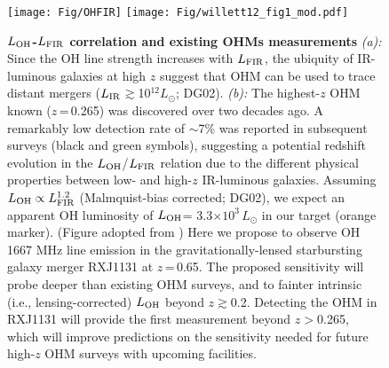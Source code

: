 \documentclass[letterpaper,11pt]{article}
\newcommand{\Lsun}{\mbox{$L_{\odot}$}\xspace}
\newcommand{\LFIR}{\mbox{$L_{\rm FIR}$}\xspace}
\newcommand{\LOH}{$L_{\rm OH}$\xspace}
\newcommand{\E}[1]{\mbox{$\times10^{#1}$}}
\newcommand{\eq}{\,=\,}
\begin{document}
\begin{figure}[ptbh]
\texttt{[image: Fig/OHFIR]} \hspace{-1.25em}
\texttt{[image: Fig/willett12\_fig1\_mod.pdf]}
\caption{{\bf \LOH-\LFIR correlation and existing OHMs measurements}
{\it (a):} Since the OH line strength increases with \LFIR,
the ubiquity of IR-luminous galaxies at high $z$ suggest that OHM can be used to trace distant mergers 
($L_{\rm IR}$$\gtrsim$10$^{12}$\Lsun; DG02).
{\it (b):} The highest-$z$ OHM known ($z$\eq0.265) was discovered over two decades ago. 
A remarkably low detection rate of $\sim$7\% was reported in subsequent surveys (black and green symbols), 
suggesting a potential redshift evolution in the \LOH/\LFIR relation
due to the different physical properties between low- and high-$z$ IR-luminous galaxies.
Assuming $L_{\rm OH}\propto L_{\rm FIR}^{1.2}$ (Malmquist-bias corrected; DG02), 
we expect an apparent OH luminosity of \LOH= 3.3\E{3}\,\Lsun in our target (orange marker). (Figure adopted from 
\citealt{Willett12a})
Here we propose to observe OH 1667 MHz line emission in the gravitationally-lensed starbursting 
galaxy merger RXJ1131 at $z$\eq0.65.
The proposed sensitivity will
probe deeper than existing OHM surveys, and to fainter intrinsic (i.e., lensing-corrected) \LOH beyond $z$$\gtrsim$0.2.
Detecting the OHM in RXJ1131 will provide the first measurement beyond $z$$>$0.265,
which will improve predictions on the sensitivity needed for future high-$z$ OHM surveys with upcoming facilities.
\label{fig:model}}
\end{figure}
\end{document}
